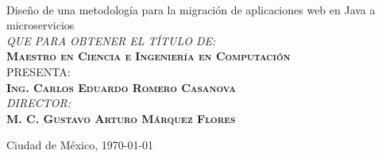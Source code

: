 \begin{changemargin}{-1cm}{-1.5cm}
{\begin{minipage}[c][0.75\textheight][t]{0.82\textwidth}
\begin{center}
          \\\vspace{5mm}
        {Diseño de una metodología para la migración de aplicaciones web en Java a microservicios}\\
        \vspace{5mm}
        \textit{QUE PARA OBTENER EL T\'ITULO DE:}\\\vspace{5mm}
        {{\scshape{\textbf{\Large{Maestro en Ciencia e Ingeniería
                  en Computación}}}}}\\[30pt]
        PRESENTA:\\[5pt]
        \Large{\textbf{\scshape{Ing. Carlos Eduardo Romero Casanova}}}\\
        \vspace{1cm}
        {{\textit{\normalsize{DIRECTOR:}}}\\[5pt]
          \textbf{\scshape{M. C. Gustavo Arturo Márquez Flores}}}
        \vspace{2cm}
        \begin{flushright}
          \small{{Ciudad de México,}{ }{\today}}
        \end{flushright}
      \end{center}
    \end{minipage}
  }
\end{changemargin}
\restoregeometry{}
\clearpage
